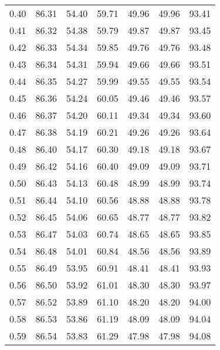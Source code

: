 \begin{tabular}{|c|c|c|c|c|c|c|}
      0.40 &     86.31 &     54.40 &      59.71 &   49.96 &      49.96 &         93.41 \\
      0.41 &     86.32 &     54.38 &      59.79 &   49.87 &      49.87 &         93.45 \\
      0.42 &     86.33 &     54.34 &      59.85 &   49.76 &      49.76 &         93.48 \\
      0.43 &     86.34 &     54.31 &      59.94 &   49.66 &      49.66 &         93.51 \\
      0.44 &     86.35 &     54.27 &      59.99 &   49.55 &      49.55 &         93.54 \\
      0.45 &     86.36 &     54.24 &      60.05 &   49.46 &      49.46 &         93.57 \\
      0.46 &     86.37 &     54.20 &      60.11 &   49.34 &      49.34 &         93.60 \\
      0.47 &     86.38 &     54.19 &      60.21 &   49.26 &      49.26 &         93.64 \\
      0.48 &     86.40 &     54.17 &      60.30 &   49.18 &      49.18 &         93.67 \\
      0.49 &     86.42 &     54.16 &      60.40 &   49.09 &      49.09 &         93.71 \\
      0.50 &     86.43 &     54.13 &      60.48 &   48.99 &      48.99 &         93.74 \\
      0.51 &     86.44 &     54.10 &      60.56 &   48.88 &      48.88 &         93.78 \\
      0.52 &     86.45 &     54.06 &      60.65 &   48.77 &      48.77 &         93.82 \\
      0.53 &     86.47 &     54.03 &      60.74 &   48.65 &      48.65 &         93.85 \\
      0.54 &     86.48 &     54.01 &      60.84 &   48.56 &      48.56 &         93.89 \\
      0.55 &     86.49 &     53.95 &      60.91 &   48.41 &      48.41 &         93.93 \\
      0.56 &     86.50 &     53.92 &      61.01 &   48.30 &      48.30 &         93.97 \\
      0.57 &     86.52 &     53.89 &      61.10 &   48.20 &      48.20 &         94.00 \\
      0.58 &     86.53 &     53.86 &      61.19 &   48.09 &      48.09 &         94.04 \\
      0.59 &     86.54 &     53.83 &      61.29 &   47.98 &      47.98 &         94.08 \\

\end{tabular}
